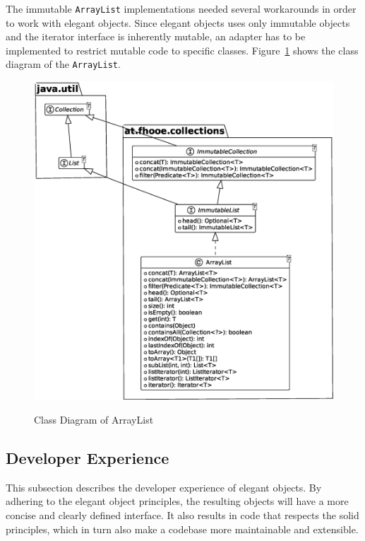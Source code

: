 The immutable \texttt{ArrayList} implementations needed several workarounds in order to work with elegant objects.
Since elegant objects uses only immutable objects and the iterator interface is inherently mutable, an adapter has to be implemented to restrict mutable code to specific classes.
Figure\ \ref{fig:arraylist-class-diagram} shows the class diagram of the \texttt{ArrayList}.

\begin{figure}[h]
    \caption{Class Diagram of ArrayList}
    \includegraphics[scale=0.25]{assets/uml/ArrayList-0}
    \label{fig:arraylist-class-diagram}
\end{figure}

\subsection{Developer Experience}\label{subsec:developer-experience}
This subsection describes the developer experience of elegant objects.
By adhering to the elegant object principles, the resulting objects will have a more concise and clearly defined interface.
It also results in code that respects the solid principles, which in turn also make a codebase more maintainable and extensible.

